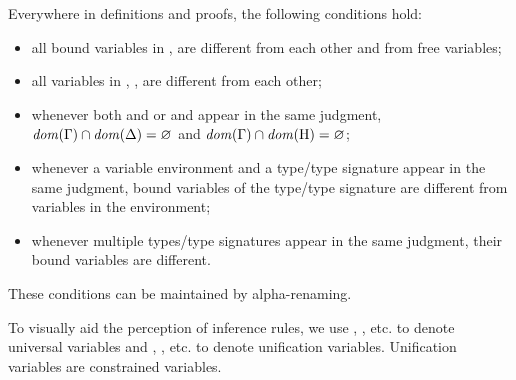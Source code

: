 \begin{definition}\label{def:var-names}
    Everywhere in definitions and proofs, the following conditions hold:
    \begin{itemize}
        \item all bound variables in \ty, \tysig are different from each other 
            and from free variables;
        \item all variables in \AEnv, \UEnv, \UEnvD are different 
            from each other;
        \item whenever both \AEnv and \UEnv or \AEnv and \UEnvD
            appear in the same judgment, 
            $\operatorname{\mathit{dom}}(\Gamma) \cap \operatorname{\mathit{dom}}(\Delta) = \varnothing$ and
                $\operatorname{\mathit{dom}}(\Gamma) \cap \operatorname{\mathit{dom}}(\mathrm{H}) = \varnothing$;
        \item whenever a variable environment and a type/type signature
            appear in the same judgment, bound variables of the type/type
            signature are different from variables in the environment;
        \item whenever multiple types/type signatures appear in the same
            judgment, their bound variables are different.
    \end{itemize}
    These conditions can be maintained by alpha-renaming.
\end{definition}

To visually aid the perception of inference rules,
we use \vx, \vy, etc. to denote universal variables
and \va, \vb, etc. to denote unification variables.
Unification variables are constrained variables.


